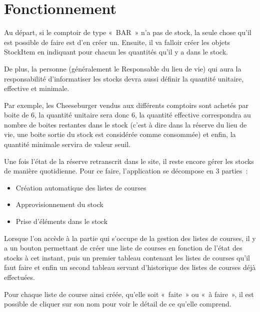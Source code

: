 \documentclass[a4paper]{report}
\begin{document}
\section{Fonctionnement}
\label{sec:fonctionnement}

\par Au départ, si le comptoir de type « BAR » n'a pas de stock, la seule chose qu'il est possible de faire est d'en
créer un. Ensuite, il va falloir créer les objets StockItem en indiquant pour chacun les quantités qu'il y a dans le
stock.

\par De plus, la personne (généralement le Responsable du lieu de vie) qui aura la responsabilité d'informatiser les
stocks devra aussi définir la quantité unitaire, effective et minimale.
\par Par exemple, les Cheeseburger vendus aux différents comptoirs sont achetés par boite de 6, la quantité unitaire
sera donc 6, la quantité effective correspondra au nombre de boites restantes dans le stock (c'est à dire dans la
réserve du lieu de vie, une boite sortie du stock est considérée comme consommée) et enfin, la quantité minimale servira
de valeur seuil.
\par Une fois l'état de la réserve retranscrit dans le site, il reste encore gérer les stocks de manière quotidienne.
Pour ce faire, l'application se décompose en 3 parties :
\begin{itemize}
    \item Création automatique des listes de courses
    \item Approvisionnement du stock
    \item Prise d'éléments dans le stock
\end{itemize}

\par Lorsque l'on accède à la partie qui s'occupe de la gestion des listes de courses, il y a un bouton permettant de
créer une liste de courses en fonction de l'état des stocks à cet instant, puis un premier tableau contenant les listes
de courses qu'il faut faire et enfin un second tableau servant d'historique des listes de courses déjà effectuées.
\par Pour chaque liste de course ainsi créée, qu'elle soit « faite » ou « à faire », il est possible de cliquer sur son
nom pour voir le détail de ce qu'elle comprend.
\end{document}
